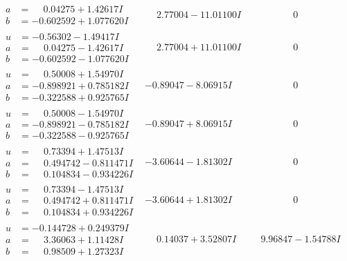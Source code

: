 \documentclass[1p]{elsarticle_modified}
\theoremstyle{definition}
\begin{document}
$$\begin{array}{c|c|c}
\begin{aligned}
a &= \phantom{-}0.04275 + 1.42617 I \\
b &= -0.602592 + 1.077620 I\end{aligned}
 & \phantom{-}2.77004 - 11.01100 I & \phantom{-0.000000 } 0 \\ \hline\begin{aligned}
u &= -0.56302 - 1.49417 I \\
a &= \phantom{-}0.04275 - 1.42617 I \\
b &= -0.602592 - 1.077620 I\end{aligned}
 & \phantom{-}2.77004 + 11.01100 I & \phantom{-0.000000 } 0 \\ \hline\begin{aligned}
u &= \phantom{-}0.50008 + 1.54970 I \\
a &= -0.898921 + 0.785182 I \\
b &= -0.322588 + 0.925765 I\end{aligned}
 & -0.89047 - 8.06915 I & \phantom{-0.000000 } 0 \\ \hline\begin{aligned}
u &= \phantom{-}0.50008 - 1.54970 I \\
a &= -0.898921 - 0.785182 I \\
b &= -0.322588 - 0.925765 I\end{aligned}
 & -0.89047 + 8.06915 I & \phantom{-0.000000 } 0 \\ \hline\begin{aligned}
u &= \phantom{-}0.73394 + 1.47513 I \\
a &= \phantom{-}0.494742 - 0.811471 I \\
b &= \phantom{-}0.104834 - 0.934226 I\end{aligned}
 & -3.60644 - 1.81302 I & \phantom{-0.000000 } 0 \\ \hline\begin{aligned}
u &= \phantom{-}0.73394 - 1.47513 I \\
a &= \phantom{-}0.494742 + 0.811471 I \\
b &= \phantom{-}0.104834 + 0.934226 I\end{aligned}
 & -3.60644 + 1.81302 I & \phantom{-0.000000 } 0 \\ \hline\begin{aligned}
u &= -0.144728 + 0.249379 I \\
a &= \phantom{-}3.36063 + 1.11428 I \\
b &= \phantom{-}0.98509 + 1.27323 I\end{aligned}
 & \phantom{-}0.14037 + 3.52807 I & \phantom{-}9.96847 - 1.54788 I \\ \hline\begin{aligned}

\end{aligned}
\end{array}$$
\end{document}
